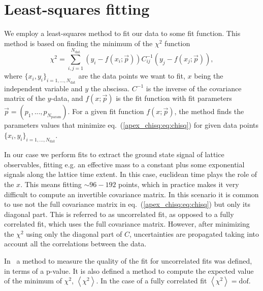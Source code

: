 
\chapter{Least-squares fitting}
\label{apex_chisq}

We employ a least-squares method to fit our data to some fit function. This method is based on finding the  minimum of the $\chi^2$ function
\begin{equation}
\label{apex_chisq:eq:chisq}
\chi^2=\sum_{i,j=1}^{N_{\textrm{dat}}}\left(y_i-f(x_i;\vec{p})\right)C_{ij}^{-1}\left(y_j-f(x_j;\vec{p})\right),
\end{equation}
where $\{x_i,y_i\}_{i=1,...,N_{\textrm{dat}}}$ are the data points we want to fit, $x$ being the independent variable and $y$ the abscissa. $C^{-1}$ is the inverse of the covariance matrix of the $y$-data, and $f(x;\vec{p})$ is the fit function with fit parameters $\vec{p}=(p_1,...,p_{N_{\textrm{param}}})$. For a given fit function $f(x;\vec{p})$, the method finds the parameters values that minimize eq.~(\ref{apex_chisq:eq:chisq}) for given data points $\{x_i,y_i\}_{i=1,...,N_{\textrm{dat}}}$.

In our case we perform fits to extract the ground state signal of lattice observables, fitting e.g. an effective mass to a constant plus some exponential signals along the lattice time extent. In this case, euclidean time plays the role of the $x$. This means fitting $\sim96-192$ points, which in practice makes it very difficult to compute an invertible covariance matrix. In this scenario it is common to use not the full covariance matrix in eq.~(\ref{apex_chisq:eq:chisq}) but only its diagonal part. This is referred to as uncorrelated fit, as opposed to a fully correlated fit, which uses the full covariance matrix. However, after minimizing the $\chi^2$ using only the diagonal part of $C$, uncertainties are propagated taking into account all the correlations between the data.

In~\citep{Bruno:2022mfy} a method to measure the quality of the fit for uncorrelated fits was defined, in terms of a p-value. It is also defined a method to compute the expected value of the minimum of $\chi^2$, $\left<\chi^2\right>$. In the case of a fully correlated fit $\left<\chi^2\right>={\textrm{dof}}$.

